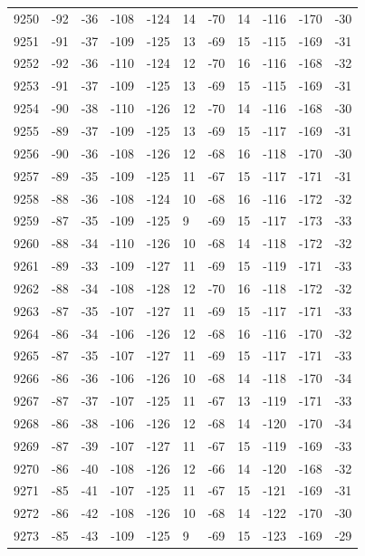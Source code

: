 \begin{table}[H]
\begin{tabular}{lllllllllll}
9250 & -92 & -36 & -108 & -124 & 14 & -70 & 14 & -116 & -170 & -30 \\
9251 & -91 & -37 & -109 & -125 & 13 & -69 & 15 & -115 & -169 & -31 \\
9252 & -92 & -36 & -110 & -124 & 12 & -70 & 16 & -116 & -168 & -32 \\
9253 & -91 & -37 & -109 & -125 & 13 & -69 & 15 & -115 & -169 & -31 \\
9254 & -90 & -38 & -110 & -126 & 12 & -70 & 14 & -116 & -168 & -30 \\
9255 & -89 & -37 & -109 & -125 & 13 & -69 & 15 & -117 & -169 & -31 \\
9256 & -90 & -36 & -108 & -126 & 12 & -68 & 16 & -118 & -170 & -30 \\
9257 & -89 & -35 & -109 & -125 & 11 & -67 & 15 & -117 & -171 & -31 \\
9258 & -88 & -36 & -108 & -124 & 10 & -68 & 16 & -116 & -172 & -32 \\
9259 & -87 & -35 & -109 & -125 & 9 & -69 & 15 & -117 & -173 & -33 \\
9260 & -88 & -34 & -110 & -126 & 10 & -68 & 14 & -118 & -172 & -32 \\
9261 & -89 & -33 & -109 & -127 & 11 & -69 & 15 & -119 & -171 & -33 \\
9262 & -88 & -34 & -108 & -128 & 12 & -70 & 16 & -118 & -172 & -32 \\
9263 & -87 & -35 & -107 & -127 & 11 & -69 & 15 & -117 & -171 & -33 \\
9264 & -86 & -34 & -106 & -126 & 12 & -68 & 16 & -116 & -170 & -32 \\
9265 & -87 & -35 & -107 & -127 & 11 & -69 & 15 & -117 & -171 & -33 \\
9266 & -86 & -36 & -106 & -126 & 10 & -68 & 14 & -118 & -170 & -34 \\
9267 & -87 & -37 & -107 & -125 & 11 & -67 & 13 & -119 & -171 & -33 \\
9268 & -86 & -38 & -106 & -126 & 12 & -68 & 14 & -120 & -170 & -34 \\
9269 & -87 & -39 & -107 & -127 & 11 & -67 & 15 & -119 & -169 & -33 \\
9270 & -86 & -40 & -108 & -126 & 12 & -66 & 14 & -120 & -168 & -32 \\
9271 & -85 & -41 & -107 & -125 & 11 & -67 & 15 & -121 & -169 & -31 \\
9272 & -86 & -42 & -108 & -126 & 10 & -68 & 14 & -122 & -170 & -30 \\
9273 & -85 & -43 & -109 & -125 & 9 & -69 & 15 & -123 & -169 & -29 \\

\end{tabular}
\end{table}
